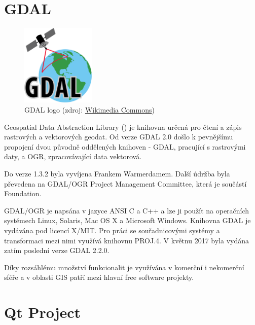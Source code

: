   
\section{GDAL}

\begin{figure}[H] \centering
      \includegraphics[width=100pt]{./pictures/gdal_logo.png}
      \caption[GDAL logo]{GDAL logo (zdroj:
\href{https://cs.wikipedia.org/wiki/Soubor:GDALLogoColor.svg}{Wikimedia Commons})}
      \label{fig:gdal}
  \end{figure}
  
Geospatial Data Abstraction Library () je knihovna určená pro
čtení a zápis rastrových a vektorových geodat. Od verze GDAL 2.0 došlo
k pevnějšímu propojení dvou původně oddělených knihoven - GDAL,
pracující s rastrovými daty, a OGR, zpracovávající data vektorová.

Do verze 1.3.2 byla vyvíjena Frankem Warmerdamem. Další údržba byla
převedena na GDAL/OGR Project Management Committee, která je součástí
 Foundation.

GDAL/OGR je napsána v jazyce ANSI C a C++ a lze ji použít na
operačních systémech Linux, Solaris, Mac OS X a Microsoft
Windows. Knihovna GDAL je vydávána pod licencí X/MIT. Pro práci se
souřadnicovými systémy a transformaci mezi nimi využívá knihovnu
PROJ.4. V květnu 2017 byla vydána zatím poslední verze GDAL 2.2.0. 
\cite{gdal}

Díky rozsáhlému množství funkcionalit je využívána v komerční i
nekomerční sféře a v oblasti GIS patří mezi hlavní free software
projekty.


\newpage
\section{Qt Project}

